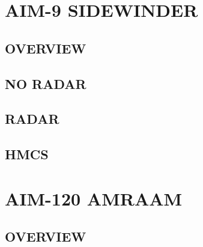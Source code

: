 \documentclass[fontInter]{TechCheck}
\begin{document}
	\clearpage

	\section{AIM-9 SIDEWINDER}
	
	\subsection{OVERVIEW}

	\subsection{NO RADAR}

	\subsection{RADAR}

	\subsection{HMCS}

	\clearpage 

	\section{AIM-120 AMRAAM}

	\subsection{OVERVIEW}
	\begin{tableitemize}
	\end{tableitemize}
	
	\clearpage
\end{document}
